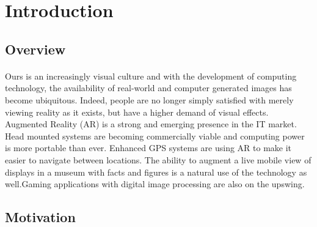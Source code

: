\section{Introduction}
\label{sec:Introduction}

\subsection{Overview} 
\paragraph{}
Ours is an increasingly visual culture and with the development of computing technology, the availability of real-world and computer generated images has become ubiquitous.  Indeed, people are no longer simply satisfied with merely viewing reality as it exists, but have a higher demand of visual effects\cite{kenny_2010}.
Augmented Reality (AR) is a strong and emerging presence in the IT market. Head mounted systems are becoming commercially viable and computing power is more portable than ever. Enhanced GPS systems are using AR to make it easier to navigate between locations. The ability to augment a live mobile view of displays in a museum with facts and figures is a natural use of the technology as well.Gaming applications with digital image processing are also on the upswing. 

\subsection{Motivation}
